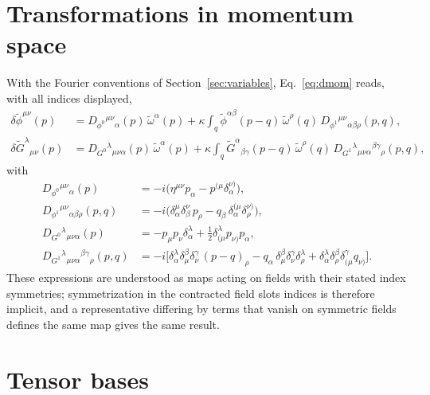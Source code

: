 \documentclass[prd,aps,preprint,superscriptaddress,nofootinbib,amsmath,amssymb,eqsecnum]{revtex4-2}
\newcommand{\tomega}{\tilde{\omega}}
\newcommand{\p}{\tilde{\phi}}
\newcommand{\G}{\tilde{G}}
\newcommand{\ip}[1]{\int_{#1}}
\providecommand{\DIFaddtex}[1]{{\protect\color{blue} \sf #1}} %
\providecommand{\DIFdeltex}[1]{{\protect\color{red} \scriptsize #1}} %
\providecommand{\DIFaddbegin}{} %
\providecommand{\DIFaddend}{} %
\providecommand{\DIFdelbegin}{} %
\providecommand{\DIFdelend}{} %
\providecommand{\DIFadd}[1]{\texorpdfstring{\DIFaddtex{#1}}{#1}} %
\providecommand{\DIFdel}[1]{\texorpdfstring{\DIFdeltex{#1}}{}} %
\begin{document}
\section{Transformations in momentum space}
\label{app:momentum}

With the Fourier conventions of Section~\ref{sec:variables}, Eq.~\eqref{eq:dmom} reads, with
all indices displayed,
\begin{align}
\delta\p^{\mu\nu}(p)&=D_{\phi^0}{}^{\mu\nu}{}_{\alpha}(p)\,\tomega^\alpha(p)
+\kappa\ip{q}\p^{\alpha\beta}(p-q)\,\tomega^\rho(q)\,D_{\phi^1}{}^{\mu\nu}{}_{\alpha\beta\rho}(p,q),\\
\delta\G^{\lambda}{}_{\mu\nu}(p)&=D_{G^0}{}^{\lambda}{}_{\mu\nu\alpha}(p)\,\tomega^\alpha(p)
+\kappa\ip{q}\G^{\alpha}{}_{\beta\gamma}(p-q)\,\tomega^\rho(q)\,
D_{G^1}{}^{\lambda}{}_{\mu\nu\alpha}{}^{\beta\gamma}{}_{\rho}(p,q),
\end{align}
with
\begin{align}
D_{\phi^0}{}^{\mu\nu}{}_{\alpha}(p)&=-i\big(\eta^{\mu\nu}p_\alpha-p^{(\mu}\delta^{\nu)}_{\alpha}\big),\\
D_{\phi^1}{}^{\mu\nu}{}_{\alpha\beta\rho}(p,q)&=-i\big(\delta^{\mu}_{\alpha}\delta^{\nu}_{\beta}\,p_\rho
-q_\beta\,\delta^{(\mu}_{\alpha}\delta^{\nu)}_{\rho}\big),\\
D_{G^0}{}^{\lambda}{}_{\mu\nu\alpha}(p)&=-p_\mu p_\nu\delta^{\lambda}_{\alpha}
+\tfrac12\delta^{\lambda}_{(\mu}p_{\nu)}p_\alpha,\\
D_{G^1}{}^{\lambda}{}_{\mu\nu\alpha}{}^{\beta\gamma}{}_{\rho}(p,q)&=-i\big[
\delta^{\lambda}_{\alpha}\delta^{\beta}_{\mu}\delta^{\gamma}_{\nu}\,(p-q)_\rho
-q_\alpha\,\delta^{\beta}_{\mu}\delta^{\gamma}_{\nu}\delta^{\lambda}_{\rho}
+\delta^{\lambda}_{\alpha}\delta^{\beta}_{\rho}\delta^{\gamma}_{(\mu}q_{\nu)}\big].
\end{align}
These expressions are understood as \DIFdelbegin \DIFdel{maps }\DIFdelend acting on fields with their stated index
symmetries; symmetrization in the contracted field \DIFdelbegin \DIFdel{slots }\DIFdelend \DIFaddbegin \DIFadd{indices }\DIFaddend is therefore implicit, and a
representative differing by terms that vanish on symmetric fields \DIFdelbegin \DIFdel{defines the same map}\DIFdelend \DIFaddbegin \DIFadd{gives the same result}\DIFaddend .

\section{Tensor bases}
\label{app:bases}
\end{document}
